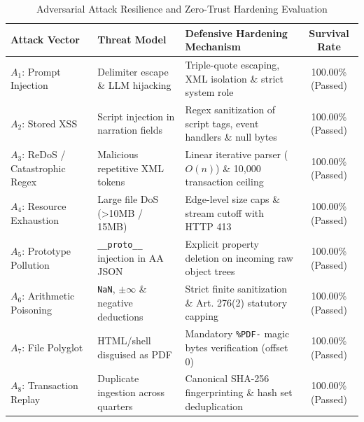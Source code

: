 \documentclass[conference]{IEEEtran}
\begin{document}
\begin{table}[t]
\caption{Adversarial Attack Resilience and Zero-Trust Hardening Evaluation}
\label{tab:adversarial_bench}
\centering
\begin{tabular}{lllc}
\toprule
\textbf{Attack Vector} & \textbf{Threat Model} & \textbf{Defensive Hardening Mechanism} & \textbf{Survival Rate} \\
\midrule
$A_1$: Prompt Injection & Delimiter escape \& LLM hijacking & Triple-quote escaping, XML isolation \& strict system role & 100.00\% (Passed) \\
$A_2$: Stored XSS & Script injection in narration fields & Regex sanitization of script tags, event handlers \& null bytes & 100.00\% (Passed) \\
$A_3$: ReDoS / Catastrophic Regex & Malicious repetitive XML tokens & Linear iterative parser ($O(n)$) \& 10,000 transaction ceiling & 100.00\% (Passed) \\
$A_4$: Resource Exhaustion & Large file DoS (>10MB / 15MB) & Edge-level size caps \& stream cutoff with HTTP 413 & 100.00\% (Passed) \\
$A_5$: Prototype Pollution & \texttt{\_\_proto\_\_} injection in AA JSON & Explicit property deletion on incoming raw object trees & 100.00\% (Passed) \\
$A_6$: Arithmetic Poisoning & \texttt{NaN}, $\pm\infty$ \& negative deductions & Strict finite sanitization \& Art. 276(2) statutory capping & 100.00\% (Passed) \\
$A_7$: File Polyglot & HTML/shell disguised as PDF & Mandatory \texttt{\%PDF-} magic bytes verification (offset 0) & 100.00\% (Passed) \\
$A_8$: Transaction Replay & Duplicate ingestion across quarters & Canonical SHA-256 fingerprinting \& hash set deduplication & 100.00\% (Passed) \\
\bottomrule
\end{tabular}
\end{table}
\end{document}
